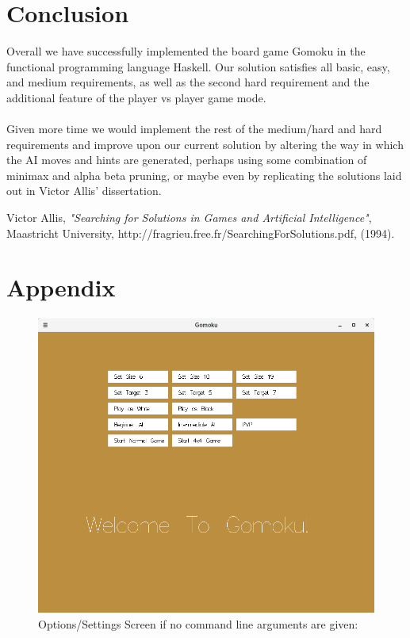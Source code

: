 \documentclass[11]{article}
\begin{document}
	
\section{Conclusion}
	Overall we have successfully implemented the board game Gomoku in the functional programming language Haskell. Our solution satisfies all basic, easy, and medium requirements, as well as the second hard requirement and the additional feature of the player vs player game mode.\\\\Given more time we would implement the rest of the medium/hard and hard requirements and improve upon our current solution by altering the way in which the AI moves and hints are generated, perhaps using some combination of minimax and alpha beta pruning, or maybe even by replicating the solutions laid out in Victor Allis' dissertation.


  	\begin{thebibliography}{1}
  		 Victor Allis, 
  		\textit{"Searching for Solutions in Games and Artificial Intelligence"}, 
  		Maastricht University, 
  		http://fragrieu.free.fr/SearchingForSolutions.pdf, 
  		(1994).
  	\end{thebibliography}
  	\newpage
\section{Appendix}
	\begin{figure}[h]
					\caption{Options/Settings Screen if no command line arguments are given:}				\centering
					\includegraphics[scale=0.5]{SettingsScreen.png}
		\end{figure}
\end{document}
